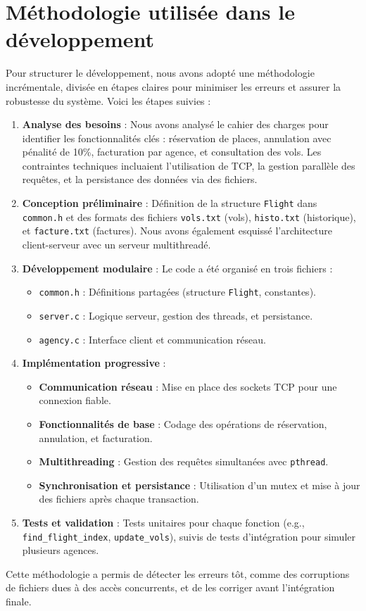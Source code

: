 \documentclass[a4paper,12pt]{article}
\begin{document}
\section{Méthodologie utilisée dans le développement}
Pour structurer le développement, nous avons adopté une méthodologie incrémentale, divisée en étapes claires pour minimiser les erreurs et assurer la robustesse du système. Voici les étapes suivies :
\begin{enumerate}
    \item \textbf{Analyse des besoins} : Nous avons analysé le cahier des charges pour identifier les fonctionnalités clés : réservation de places, annulation avec pénalité de 10\%, facturation par agence, et consultation des vols. Les contraintes techniques incluaient l'utilisation de TCP, la gestion parallèle des requêtes, et la persistance des données via des fichiers.
    \item \textbf{Conception préliminaire} : Définition de la structure \texttt{Flight} dans \texttt{common.h} et des formats des fichiers \texttt{vols.txt} (vols), \texttt{histo.txt} (historique), et \texttt{facture.txt} (factures). Nous avons également esquissé l'architecture client-serveur avec un serveur multithreadé.
    \item \textbf{Développement modulaire} : Le code a été organisé en trois fichiers :
        \begin{itemize}
            \item \texttt{common.h} : Définitions partagées (structure \texttt{Flight}, constantes).
            \item \texttt{server.c} : Logique serveur, gestion des threads, et persistance.
            \item \texttt{agency.c} : Interface client et communication réseau.
        \end{itemize}
    \item \textbf{Implémentation progressive} :
        \begin{itemize}
            \item \textbf{Communication réseau} : Mise en place des sockets TCP pour une connexion fiable.
            \item \textbf{Fonctionnalités de base} : Codage des opérations de réservation, annulation, et facturation.
            \item \textbf{Multithreading} : Gestion des requêtes simultanées avec \texttt{pthread}.
            \item \textbf{Synchronisation et persistance} : Utilisation d’un mutex et mise à jour des fichiers après chaque transaction.
        \end{itemize}
    \item \textbf{Tests et validation} : Tests unitaires pour chaque fonction (e.g., \texttt{find_flight_index}, \texttt{update_vols}), suivis de tests d'intégration pour simuler plusieurs agences.
\end{enumerate}
\begin{highlightbox}
Cette méthodologie a permis de détecter les erreurs tôt, comme des corruptions de fichiers dues à des accès concurrents, et de les corriger avant l'intégration finale.
\end{highlightbox}
\end{document}
